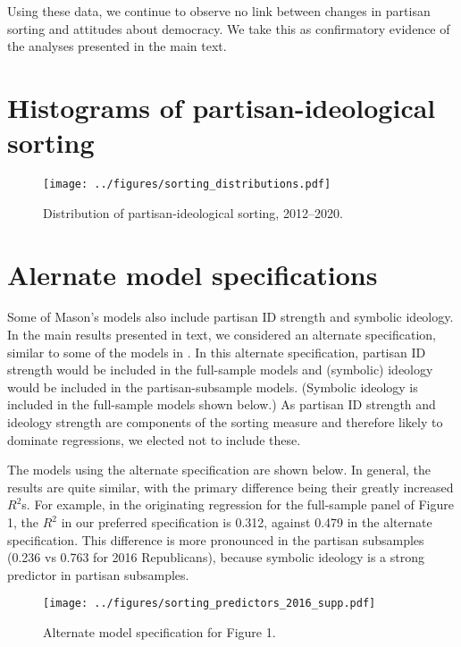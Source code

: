 \documentclass[10pt,landscape]{article}
\begin{document}
Using these data, we continue to observe no link between changes in partisan sorting and attitudes about democracy. 
We take this as confirmatory evidence of the analyses presented in the main text.




\clearpage
\section{Histograms of partisan-ideological sorting}

\begin{figure}[h]
    \centering
    \texttt{[image: ../figures/sorting\_distributions.pdf]}
    \caption{Distribution of partisan-ideological sorting, 2012--2020.}
    \label{fig:sorting_distribution}
\end{figure}

\clearpage
\section{Alernate model specifications}

Some of Mason’s models also include partisan ID strength and symbolic ideology. 
In the main results presented in text, we considered an alternate specification, similar to some of the models in \textcite{mason_uncivil_2018}.
In this alternate specification, partisan ID strength would be included in the full-sample models and (symbolic) ideology would be included in the partisan-subsample models.
(Symbolic ideology is included in the full-sample models shown below.)
As partisan ID strength and ideology strength are components of the sorting measure and therefore likely to dominate regressions, we elected not to include these. 

The models using the alternate specification are shown below.
In general, the results are quite similar, with the primary difference being their greatly increased \(R^2\)s.
For example, in the originating regression for the full-sample panel of Figure 1, the \(R^2\) in our preferred specification is 0.312, against 0.479 in the alternate specification.
This difference is more pronounced in the partisan subsamples (0.236 vs 0.763 for 2016 Republicans), because symbolic ideology is a strong predictor in partisan subsamples.

\clearpage
\begin{figure}[h]
    \centering
    \texttt{[image: ../figures/sorting\_predictors\_2016\_supp.pdf]}
    \caption{Alternate model specification for Figure 1.}
    \label{fig:sorting_predictors_2016_supp}
\end{figure}
\end{document}
